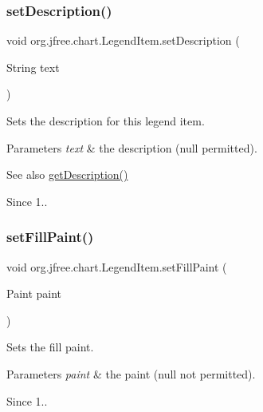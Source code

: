 \subsubsection{\texorpdfstring{set\+Description()}{setDescription()}}
{\footnotesize\ttfamily void org.\+jfree.\+chart.\+Legend\+Item.\+set\+Description (\begin{DoxyParamCaption}\item[{String}]{text }\end{DoxyParamCaption})}

Sets the description for this legend item.


\begin{DoxyParams}{Parameters}
{\em text} & the description ({\ttfamily null} permitted).\\
\hline
\end{DoxyParams}
\begin{DoxySeeAlso}{See also}
\mbox{\hyperlink{classorg_1_1jfree_1_1chart_1_1_legend_item_ae9145881d91551b169d3e47ebbe024a4}{get\+Description()}} 
\end{DoxySeeAlso}
\begin{DoxySince}{Since}
1.. 
\end{DoxySince}
\mbox{\label{classorg_1_1jfree_1_1chart_1_1_legend_item_a8c3428a5e7e08be6abf1b4ac4de5e59a}} 
\subsubsection{\texorpdfstring{set\+Fill\+Paint()}{setFillPaint()}}
{\footnotesize\ttfamily void org.\+jfree.\+chart.\+Legend\+Item.\+set\+Fill\+Paint (\begin{DoxyParamCaption}\item[{Paint}]{paint }\end{DoxyParamCaption})}

Sets the fill paint.


\begin{DoxyParams}{Parameters}
{\em paint} & the paint ({\ttfamily null} not permitted).\\
\hline
\end{DoxyParams}
\begin{DoxySince}{Since}
1.. 
\end{DoxySince}
\mbox{\label{classorg_1_1jfree_1_1chart_1_1_legend_item_a305f0ef5afe94be43e8eb6bf00a85366}} 

